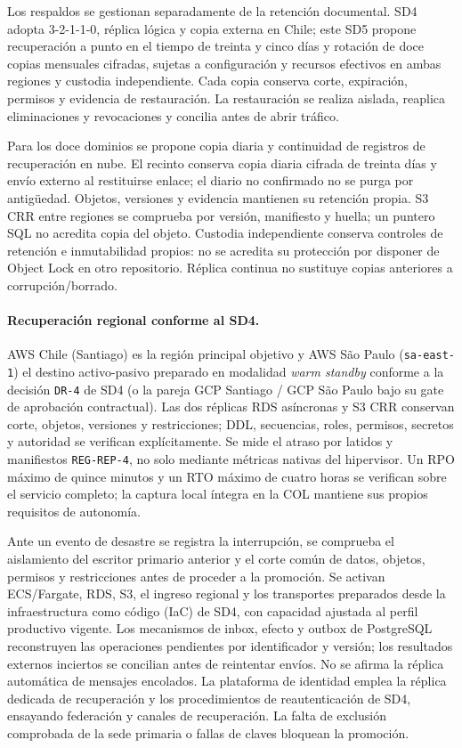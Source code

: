 Los respaldos se gestionan separadamente de la retención documental. SD4 adopta 3-2-1-1-0, réplica lógica y copia externa en Chile; este SD5 propone recuperación a punto en el tiempo de treinta y cinco días y rotación de doce copias mensuales cifradas, sujetas a configuración y recursos efectivos en ambas regiones y custodia independiente. Cada copia conserva corte, expiración, permisos y evidencia de restauración. La restauración se realiza aislada, reaplica eliminaciones y revocaciones y concilia antes de abrir tráfico.

Para los doce dominios se propone copia diaria y continuidad de registros de recuperación en nube. El recinto conserva copia diaria cifrada de treinta días y envío externo al restituirse enlace; el diario no confirmado no se purga por antigüedad. Objetos, versiones y evidencia mantienen su retención propia. S3 CRR entre regiones se comprueba por versión, manifiesto y huella; un puntero SQL no acredita copia del objeto. Custodia independiente conserva controles de retención e inmutabilidad propios: no se acredita su protección por disponer de Object Lock en otro repositorio. Réplica continua no sustituye copias anteriores a corrupción/borrado.

\paragraph{Recuperación regional conforme al SD4.} AWS Chile (Santiago) es la región principal objetivo y AWS São Paulo (\texttt{sa-east-1}) el destino activo-pasivo preparado en modalidad \emph{warm standby} conforme a la decisión \texttt{DR-4} de SD4 (o la pareja GCP Santiago / GCP São Paulo bajo su gate de aprobación contractual). Las dos réplicas RDS asíncronas y S3 CRR conservan corte, objetos, versiones y restricciones; DDL, secuencias, roles, permisos, secretos y autoridad se verifican explícitamente. Se mide el atraso por latidos y manifiestos \texttt{REG-REP-4}, no solo mediante métricas nativas del hipervisor. Un RPO máximo de quince minutos y un RTO máximo de cuatro horas se verifican sobre el servicio completo; la captura local íntegra en la COL mantiene sus propios requisitos de autonomía.

Ante un evento de desastre se registra la interrupción, se comprueba el aislamiento del escritor primario anterior y el corte común de datos, objetos, permisos y restricciones antes de proceder a la promoción. Se activan ECS/Fargate, RDS, S3, el ingreso regional y los transportes preparados desde la infraestructura como código (IaC) de SD4, con capacidad ajustada al perfil productivo vigente. Los mecanismos de inbox, efecto y outbox de PostgreSQL reconstruyen las operaciones pendientes por identificador y versión; los resultados externos inciertos se concilian antes de reintentar envíos. No se afirma la réplica automática de mensajes encolados. La plataforma de identidad emplea la réplica dedicada de recuperación y los procedimientos de reautenticación de SD4, ensayando federación y canales de  recuperación. La falta de exclusión comprobada de la sede primaria o fallas de claves bloquean la promoción.

